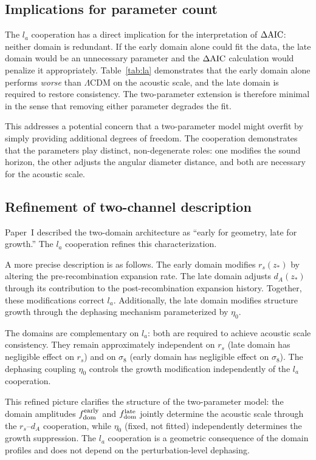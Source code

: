 \documentclass[aps,prd,twocolumn,superscriptaddress,nofootinbib]{revtex4-2}
\newcommand{\fdom}{f_{\rm dom}}
\newcommand{\dAIC}{\Delta{\rm AIC}}
\begin{document}
\subsection{Implications for parameter count}
\label{sec:param_count}

The $l_a$ cooperation has a direct implication for the
interpretation of $\dAIC$: neither domain is redundant. If the
early domain alone could fit the data, the late domain would be an
unnecessary parameter and the $\dAIC$ calculation would penalize it
appropriately. Table~\ref{tab:la} demonstrates that the early domain
alone performs \emph{worse} than $\Lambda$CDM on the acoustic
scale, and the late domain is required to restore consistency. The
two-parameter extension is therefore minimal in the sense that
removing either parameter degrades the fit.

This addresses a potential concern that a two-parameter model might
overfit by simply providing additional degrees of freedom. The
cooperation demonstrates that the parameters play distinct,
non-degenerate roles: one modifies the sound horizon, the other
adjusts the angular diameter distance, and both are necessary for
the acoustic scale.

\subsection{Refinement of two-channel description}
\label{sec:refinement}

Paper~I described the two-domain architecture as ``early for
geometry, late for growth.'' The $l_a$ cooperation refines this
characterization.

A more precise description is as follows. The early domain modifies
$r_s(z_*)$ by altering the pre-recombination expansion rate. The
late domain adjusts $d_A(z_*)$ through its contribution to the
post-recombination expansion history. Together, these modifications
correct $l_a$. Additionally, the late domain modifies structure
growth through the dephasing mechanism parameterized by $\eta_0$.

The domains are complementary on $l_a$: both are required to achieve
acoustic scale consistency. They remain approximately independent on
$r_s$ (late domain has negligible effect on $r_s$) and on $\sigma_8$
(early domain has negligible effect on $\sigma_8$). The dephasing
coupling $\eta_0$ controls the growth modification independently of
the $l_a$ cooperation.

This refined picture clarifies the structure of the two-parameter
model: the domain amplitudes $\fdom^{\rm early}$ and $\fdom^{\rm
late}$ jointly determine the acoustic scale through the
$r_s$--$d_A$ cooperation, while $\eta_0$ (fixed, not fitted)
independently determines the growth suppression. The $l_a$
cooperation is a geometric consequence of the domain profiles and
does not depend on the perturbation-level dephasing.
\end{document}
